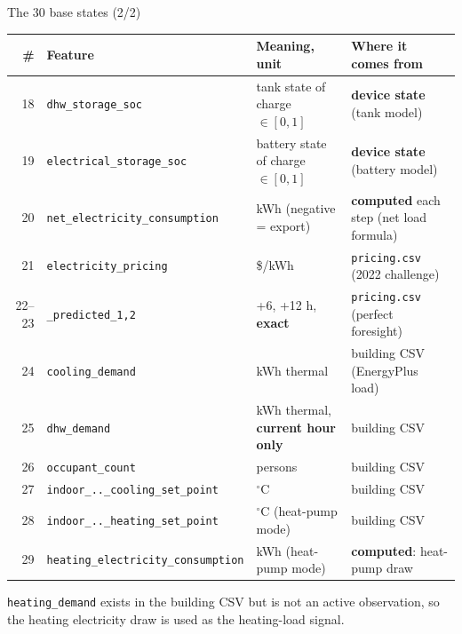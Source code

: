 \documentclass[aspectratio=169,10pt]{beamer}
\begin{document}
\begin{frame}{The 30 base states (2/2)}
\scriptsize
\begin{tabularx}{\textwidth}{@{}rl>{\raggedright\arraybackslash}X>{\raggedright\arraybackslash}p{4.2cm}@{}}
\toprule
\# & Feature & Meaning, unit & Where it comes from \\
\midrule
18 & \texttt{dhw\_storage\_soc} & tank state of charge $\in[0,1]$ & \textbf{device state} (tank model) \\
19 & \texttt{electrical\_storage\_soc} & battery state of charge $\in[0,1]$ & \textbf{device state} (battery model) \\
20 & \texttt{net\_electricity\_consumption} & kWh (negative = export) & \textbf{computed} each step (net load formula) \\
21 & \texttt{electricity\_pricing} & \$/kWh & \texttt{pricing.csv} (2022 challenge) \\
22--23 & \quad \texttt{\_predicted\_1,2} & +6, +12 h, \textbf{exact} & \texttt{pricing.csv} (perfect foresight) \\
24 & \texttt{cooling\_demand} & kWh thermal & building CSV (EnergyPlus load) \\
25 & \texttt{dhw\_demand} & kWh thermal, \textbf{current hour only} & building CSV \\
26 & \texttt{occupant\_count} & persons & building CSV \\
27 & \texttt{indoor\_..\_cooling\_set\_point} & $^\circ$C & building CSV \\
\midrule
28 & \texttt{indoor\_..\_heating\_set\_point} & $^\circ$C (heat-pump mode) & building CSV \\
29 & \texttt{heating\_electricity\_consumption} & kWh (heat-pump mode) & \textbf{computed}: heat-pump draw \\
\bottomrule
\end{tabularx}
\vspace{0.3em}

\small \texttt{heating\_demand} exists in the building CSV but is not an active observation, so the heating electricity draw is used as the heating-load signal.
\end{frame}
\end{document}
